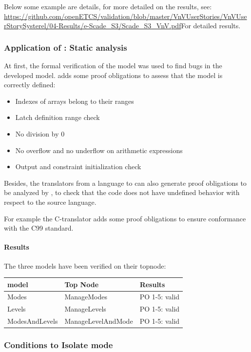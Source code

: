 Below some example are details, for more detailed on the results, see: \url{https://github.com/openETCS/validation/blob/master/VnVUserStories/VnVUserStorySysterel/04-Results/e-Scade_S3/Scade_S3_VnV.pdf}For detailed results.



\subsubsection{Application of \smartsolver{}: Static analysis}
\label{sec:static-analysis}

At first, the formal verification of the model was used to find bugs in the developed
\SCADE{} model.
\smartsolver{} adds some proof obligations to assess that the \HLL{}
model is correctly defined:
\begin{itemize}
\item Indexes of arrays belong to their ranges
\item Latch definition range check
\item No division by 0
\item No overflow and no underflow on arithmetic expressions
\item Output and constraint initialization check
\end{itemize}

Besides, the translators from a language to \HLL{} can also generate proof obligations to be analyzed by \smartsolver{},
to check that the code does not have undefined behavior with respect to the source language.

For example the C-translator adds some proof obligations to ensure conformance with the C99 standard.


\paragraph{Results}
The three models have been verified on their topnode:

\begin{tabular}{|l|l|l|}
\hline
\textbf{\SCADE{} model} & \textbf{Top Node} & \textbf{Results}  \\ \hline
Modes & ManageModes &  PO 1-5: valid \\
Levels & ManageLevels &  PO 1-5: valid \\
ModesAndLevels & ManageLevelAndMode & PO 1-5: valid \\
\hline
\end{tabular}

\subsubsection{Conditions to Isolate mode}
\label{sec:isolate}

